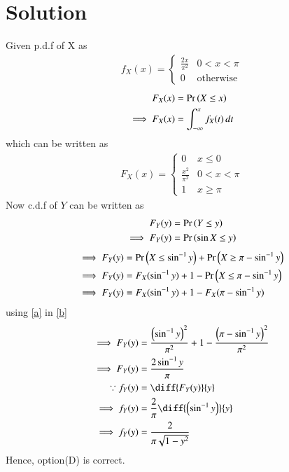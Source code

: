 \documentclass[journal,12pt,twocolumn]{IEEEtran}
\begin{document}
\section*{Solution}
Given p.d.f of X as
\begin{align}
    f_{X}(x)=\begin{cases} 
            \frac{2x}{\pi^2}  &  0<x<\pi\\
            0 & \text{otherwise}
            \end{cases} 
\end{align}
\begin{align}
    F_X(x) &= \Pr\left(X\leq x\right)\\
    \implies F_X(x) &= \int_{-\infty}^{x}f_X(t)\,dt
\end{align}
which can be written as
\begin{align}
    F_{X}(x)=\begin{cases} 
            0 & x\le 0\\
            \frac{x^2}{\pi^2}  &  0<x<\pi\\
            1 & x\ge \pi
            \end{cases}
            \label{a}
\end{align}
Now c.d.f of $Y$ can be written as 
\begin{align}
    F_Y(y) &= \Pr\left(Y\leq y\right)\\
    \implies F_Y(y) &= \Pr\left(\sin{X}\leq y\right)
\end{align}
\begin{align}
    \implies F_Y(y) &= \Pr\left(X\leq \sin^{-1}{y}\right)+\Pr\left(X\geq \pi-\sin^{-1}{y}\right)\\
    \implies F_Y(y) &= F_X(\sin^{-1}{y})+1-\Pr\left(X\leq \pi-\sin^{-1}{y}\right)\\
    \implies F_Y(y) &= F_X(\sin^{-1}{y})+1-F_X(\pi-\sin^{-1}{y})
    \label{b}
\end{align}
using \eqref{a} in \eqref{b}
\begin{align}
    \implies F_Y(y) &= \frac{\brak{\sin^{-1}{y}}^2}{\pi^2}+1-\frac{\brak{\pi-\sin^{-1}{y}}^2}{\pi^2}\\
    \implies F_Y(y) &= \frac{2\sin^{-1}{y}}{\pi}\\
    \because f_Y(y) &= \diff{F_Y(y)}{y}\\
    \implies f_Y(y) &= \frac{2}{\pi}\diff{\brak{\sin^{-1}{y}}}{y}\\
    \implies f_Y(y) &= \frac{2}{\pi\sqrt{1-y^2}}
\end{align}
Hence, option(D) is correct.
\end{document}

